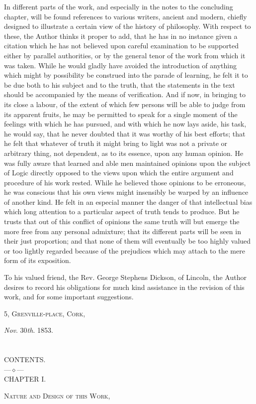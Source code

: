 \documentclass[oneside]{book}
\begin{document}
In different parts of the work, and especially in the notes to
the concluding chapter, will be found references to various writers,
ancient and modern, chiefly designed to illustrate a certain view of
the history of philosophy. With respect to these, the Author
thinks it proper to add, that he has in no instance given a citation
which he has not believed upon careful examination to be
supported either by parallel authorities, or by the general tenor
of the work from which it was taken. While he would gladly
have avoided the introduction of anything which might by possibility
be construed into the parade of learning, he felt it to be
due both to his subject and to the truth, that the statements in
the text should be accompanied by the means of verification.
And if now, in bringing to its close a labour, of the extent of
which few persons will be able to judge from its apparent fruits,
he may be permitted to speak for a single moment of the feelings
with which he has pursued, and with which he now lays aside,
his task, he would say, that he never doubted that it was worthy of
his best efforts; that he felt that whatever of truth it might bring
to light was not a private or arbitrary thing, not dependent, as to
its essence, upon any human opinion. He was fully aware that
learned and able men maintained opinions upon the subject of
Logic directly opposed to the views upon which the entire argument
and procedure of his work rested. While he believed those
opinions to be erroneous, he was conscious that his own views
might insensibly be warped by an influence of another kind. He
felt in an especial manner the danger of that intellectual bias which
long attention to a particular aspect of truth tends to produce.
But he trusts that out of this conflict of opinions the same truth
will but emerge the more free from any personal admixture; that
its different parts will be seen in their just proportion; and that
none of them will eventually be too highly valued or too lightly
regarded because of the prejudices which may attach to the
mere form of its exposition.

To his valued friend, the Rev. George Stephens Dickson,
of Lincoln, the Author desires to record his obligations for much
kind assistance in the revision of this work, and for some important
suggestions.

5, \textsc{Grenville-place, Cork},

\textit{Nov}. 30\textit{th}. 1853.
\chapter[CONTENTS.]{}
\begin{center}\Huge CONTENTS.\\
\bigskip
\normalsize
---$\diamond$---\\
\bigskip
\large
CHAPTER I.
\end{center}
\normalsize
\textsc{Nature and Design of this Work,}
\end{document}
